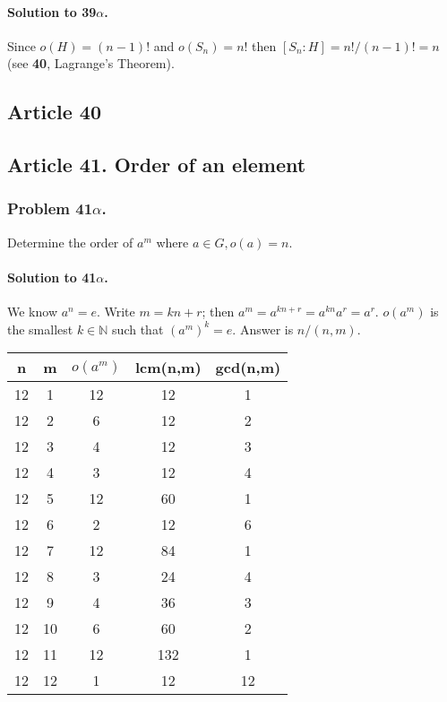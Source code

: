 \paragraph*{Solution to 39$\alpha$.}
Since $o(H) = (n-1)!$ and $o(S_n) = n!$ then $[S_n:H] = n! / (n-1)! = n$ (see
\textbf{40}, Lagrange's Theorem).

\subsection{Article 40}

\subsection{Article 41. Order of an element}
\subsubsection{Problem 41$\alpha$.}
Determine the order of $a^m$ where $a\in G, o(a)=n$.

\paragraph*{Solution to 41$\alpha$.}
We know $a^n=e$. Write $m=kn+r$; then $a^m=a^{kn+r}=a^{kn}a^r=a^r$.
$o(a^m)$ is the smallest $k \in \mathbb{N}$ such that $(a^m)^k=e$.
Answer is $n /(n, m)$.

\begin{center}
\begin{tabular}{|c|c|c|c|c|}
\hline
n & m & $o(a^m)$ & lcm(n,m) & gcd(n,m) \\
\hline
12 & 1 & 12 & 12 & 1\\
12 & 2 & 6 & 12 & 2 \\
12 & 3 & 4 & 12 & 3 \\
12 & 4 & 3 & 12 & 4 \\
12 & 5 & 12 & 60 & 1 \\
12 & 6 & 2 & 12 & 6 \\
12 & 7 & 12 & 84 & 1 \\
12 & 8 & 3 & 24 & 4 \\
12 & 9 & 4 & 36 & 3 \\
12 & 10 & 6 & 60 & 2 \\
12 & 11 & 12 & 132 & 1 \\
12 & 12 & 1 & 12 & 12 \\
\hline
\end{tabular}
\end{center}

